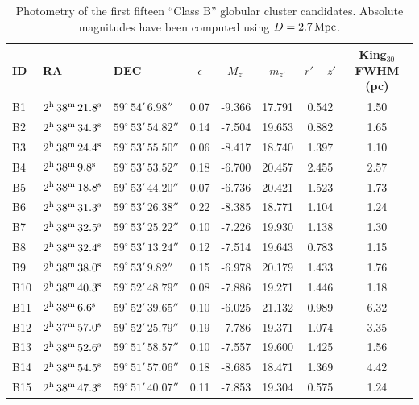 \documentclass[useAMS,usenatbib]{mn2e}
\begin{document}
\begin{table}
 \centering
  \caption{Photometry of the first fifteen ``Class B'' globular cluster candidates. Absolute magnitudes have been computed using $D = 2.7\,\rm{Mpc}$.}
\label{tab:class_b}  
\begin{tabular}{lllccccc}
	\hline
	ID & RA & DEC & $\epsilon$ & $M_{z'}$ & $m_{z'}$ & $r'-z'$ & King$_{30}$ FWHM (pc) \\
	\hline
	B1 & $2^{\rm{h}}\,38^{\rm{m}}\,21.8^{\rm{s}}$ & $59^\circ\,54'\,6.98''$ & 0.07 & -9.366 & 17.791 & 0.542 & 1.50 \\
	B2 & $2^{\rm{h}}\,38^{\rm{m}}\,34.3^{\rm{s}}$ & $59^\circ\,53'\,54.82''$ & 0.14 & -7.504 & 19.653 & 0.882 & 1.65 \\
	B3 & $2^{\rm{h}}\,38^{\rm{m}}\,24.4^{\rm{s}}$ & $59^\circ\,53'\,55.50''$ & 0.06 & -8.417 & 18.740 & 1.397 & 1.10 \\
	B4 & $2^{\rm{h}}\,38^{\rm{m}}\,9.8^{\rm{s}}$ & $59^\circ\,53'\,53.52''$ & 0.18 & -6.700 & 20.457 & 2.455 & 2.57 \\
	B5 & $2^{\rm{h}}\,38^{\rm{m}}\,18.8^{\rm{s}}$ & $59^\circ\,53'\,44.20''$ & 0.07 & -6.736 & 20.421 & 1.523 & 1.73 \\
	B6 & $2^{\rm{h}}\,38^{\rm{m}}\,31.3^{\rm{s}}$ & $59^\circ\,53'\,26.38''$ & 0.22 & -8.385 & 18.771 & 1.104 & 1.24 \\
	B7 & $2^{\rm{h}}\,38^{\rm{m}}\,32.5^{\rm{s}}$ & $59^\circ\,53'\,25.22''$ & 0.10 & -7.226 & 19.930 & 1.138 & 1.30 \\
	B8 & $2^{\rm{h}}\,38^{\rm{m}}\,32.4^{\rm{s}}$ & $59^\circ\,53'\,13.24''$ & 0.12 & -7.514 & 19.643 & 0.783 & 1.15 \\
	B9 & $2^{\rm{h}}\,38^{\rm{m}}\,38.0^{\rm{s}}$ & $59^\circ\,53'\,9.82''$ & 0.15 & -6.978 & 20.179 & 1.433 & 1.76 \\
	B10 & $2^{\rm{h}}\,38^{\rm{m}}\,40.3^{\rm{s}}$ & $59^\circ\,52'\,48.79''$ & 0.08 & -7.886 & 19.271 & 1.446 & 1.18 \\
	B11 & $2^{\rm{h}}\,38^{\rm{m}}\,6.6^{\rm{s}}$ & $59^\circ\,52'\,39.65''$ & 0.10 & -6.025 & 21.132 & 0.989 & 6.32 \\
	B12 & $2^{\rm{h}}\,37^{\rm{m}}\,57.0^{\rm{s}}$ & $59^\circ\,52'\,25.79''$ & 0.19 & -7.786 & 19.371 & 1.074 & 3.35 \\
	B13 & $2^{\rm{h}}\,38^{\rm{m}}\,52.6^{\rm{s}}$ & $59^\circ\,51'\,58.57''$ & 0.10 & -7.557 & 19.600 & 1.425 & 1.56 \\
	B14 & $2^{\rm{h}}\,38^{\rm{m}}\,54.5^{\rm{s}}$ & $59^\circ\,51'\,57.06''$ & 0.18 & -8.685 & 18.471 & 1.369 & 4.42 \\
	B15 & $2^{\rm{h}}\,38^{\rm{m}}\,47.3^{\rm{s}}$ & $59^\circ\,51'\,40.07''$ & 0.11 & -7.853 & 19.304 & 0.575 & 1.24 \\
	\hline
\end{tabular}
\end{table}



\label{lastpage}
\end{document}
